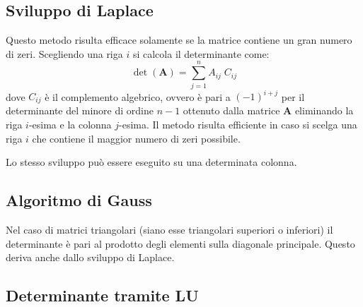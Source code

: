 \documentclass[10pt]{article}
\begin{document}
\subsection{Sviluppo di Laplace}

Questo metodo risulta efficace solamente se la matrice contiene un gran numero di zeri. Scegliendo una riga $i$ si calcola il determinante come:
\begin{equation}
\det(\mathbf{A}) = \sum_{j=1}^n A_{ij} \; C_{ij}
\end{equation}
dove $C_{ij}$ è il complemento algebrico, ovvero è pari a $(-1)^{i+j}$ per il determinante del minore di ordine $n-1$ ottenuto dalla matrice $\mathbf{A}$ eliminando la riga $i$-esima e la colonna $j$-esima.
Il metodo risulta efficiente in caso si scelga una riga $i$ che contiene il maggior numero di zeri possibile.

Lo stesso sviluppo può essere eseguito su una determinata colonna.

\subsection{Algoritmo di Gauss}

Nel caso di matrici triangolari (siano esse triangolari superiori o inferiori) il determinante è pari al prodotto degli elementi sulla diagonale principale. Questo deriva anche dallo sviluppo di Laplace.




\subsection{Determinante tramite LU}
\end{document}
